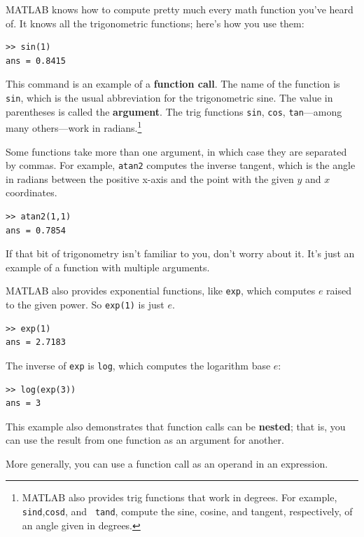 \documentclass[
]{book}
\begin{document}
MATLAB knows how to compute pretty much every math function you've
heard of.  It knows all the trigonometric functions; here's how you
use them:

\begin{verbatim}
>> sin(1)
ans = 0.8415
\end{verbatim}

This command is an example of a {\bf function call}.  The name of the
function is {\tt sin}, which is the usual abbreviation for the
trigonometric sine.  The value in parentheses is called the {\bf argument}.
The trig functions {\tt sin}, {\tt cos}, {\tt tan}---among many
others---work in radians.\footnote{MATLAB also provides trig functions
that work in degrees. For example, {\tt sind},{\tt cosd}, and {\tt
tand}, compute the sine, cosine, and tangent, respectively, of an angle given in
degrees.}

Some functions take more than one argument, in which case they are
separated by commas.  For example, {\tt atan2} computes the inverse
tangent, which is the angle in radians between the positive x-axis and
the point with the given $y$ and $x$ coordinates.

\begin{verbatim}
>> atan2(1,1)
ans = 0.7854
\end{verbatim}

If that bit of trigonometry isn't familiar to you, don't worry about
it.  It's just an example of a function with multiple arguments.

MATLAB also provides exponential functions, like {\tt exp}, which
computes $e$ raised to the given power.  So {\tt exp(1)} is just $e$.

\begin{verbatim}
>> exp(1)
ans = 2.7183
\end{verbatim}

The inverse of {\tt exp} is {\tt log}, which computes the logarithm
base $e$:

\begin{verbatim}
>> log(exp(3))
ans = 3
\end{verbatim}

This example also demonstrates that function calls can be {\bf nested};
that is, you can use the result from one function as an argument for
another.

More generally, you can use a function call as an operand in an expression.
\end{document}
